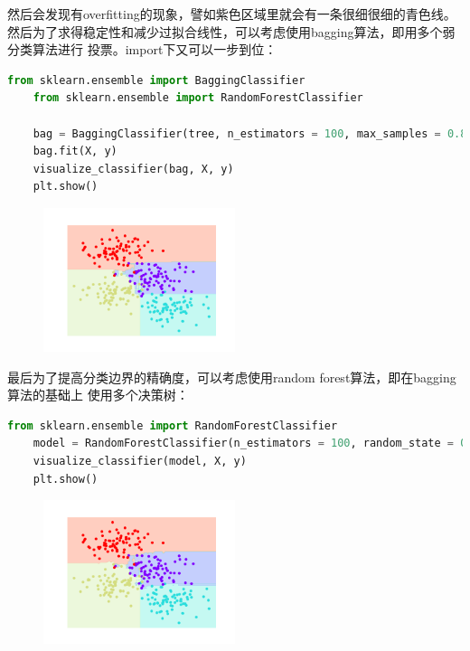\documentclass{article}
\begin{document}
然后会发现有overfitting的现象，譬如紫色区域里就会有一条很细很细的青色线。
然后为了求得稳定性和减少过拟合线性，可以考虑使用bagging算法，即用多个弱分类算法进行
投票。import下又可以一步到位：
\begin{lstlisting}[language=Python]
    from sklearn.ensemble import BaggingClassifier
    from sklearn.ensemble import RandomForestClassifier

    bag = BaggingClassifier(tree, n_estimators = 100, max_samples = 0.8, random_state = 1)
    bag.fit(X, y)
    visualize_classifier(bag, X, y)
    plt.show()
\end{lstlisting}

\begin{figure}[H]
    \centering
    \includegraphics[width=0.5\textwidth]{3.png}
\end{figure}

最后为了提高分类边界的精确度，可以考虑使用random forest算法，即在bagging算法的基础上
使用多个决策树：
\begin{lstlisting}[language=Python]
    from sklearn.ensemble import RandomForestClassifier
    model = RandomForestClassifier(n_estimators = 100, random_state = 0)
    visualize_classifier(model, X, y)
    plt.show()
\end{lstlisting}

\begin{figure}[H]
    \centering
    \includegraphics[width=0.5\textwidth]{4.png}
\end{figure}
\end{document}
